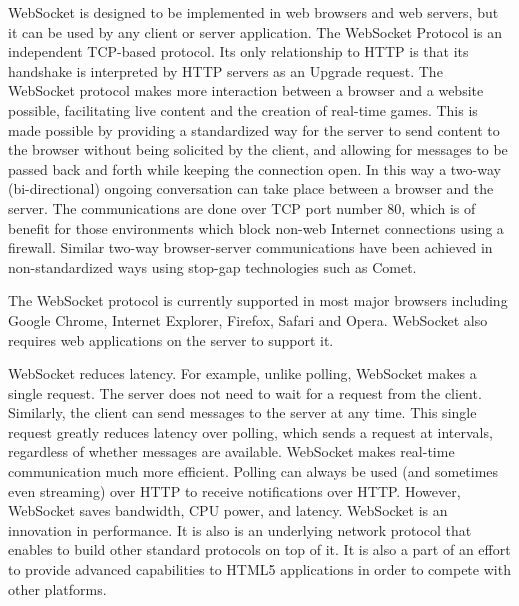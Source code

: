 WebSocket is designed to be implemented in web browsers and web servers, but it can be used by any client or server application. The WebSocket Protocol is an independent TCP-based protocol. Its only relationship to HTTP is that its handshake is interpreted by HTTP servers as an Upgrade request. The WebSocket protocol makes more interaction between a browser and a website possible, facilitating live content and the creation of real-time games. This is made possible by providing a standardized way for the server to send content to the browser without being solicited by the client, and allowing for messages to be passed back and forth while keeping the connection open. In this way a two-way (bi-directional) ongoing conversation can take place between a browser and the server. The communications are done over TCP port number 80, which is of benefit for those environments which block non-web Internet connections using a firewall. Similar two-way browser-server communications have been achieved in non-standardized ways using stop-gap technologies such as Comet.

The WebSocket protocol is currently supported in most major browsers including Google Chrome, Internet Explorer, Firefox, Safari and Opera. WebSocket also requires web applications on the server to support it.

WebSocket reduces latency. For example, unlike polling, WebSocket makes a single request. The server does not need to wait for a request from the client. Similarly, the client can send messages to the server at any time. This single request greatly reduces latency over polling, which sends a request at intervals, regardless of whether messages are available. WebSocket makes real-time communication much more efficient. Polling can always be used (and sometimes even streaming) over HTTP to receive notifications over HTTP. However, WebSocket saves bandwidth, CPU power, and latency. WebSocket is an innovation in performance. It is also is an underlying network protocol that enables to build other standard protocols on top of it. It is also a part of an effort to provide advanced capabilities to HTML5 applications in order to compete with other platforms.

